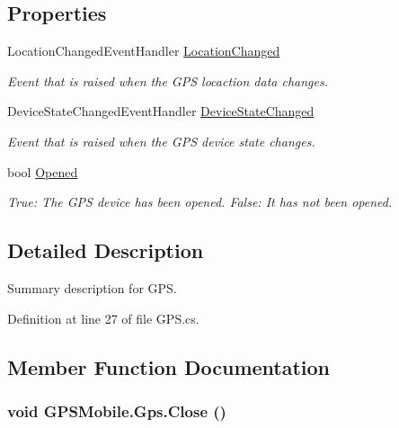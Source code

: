 \subsection*{Properties}
\begin{DoxyCompactItemize}
\item 
LocationChangedEventHandler \hyperlink{class_g_p_s_mobile_1_1_gps_a47e124eef5d1e94dc800878a046540ae}{LocationChanged}
\begin{DoxyCompactList}\small\item\em Event that is raised when the GPS locaction data changes. \item\end{DoxyCompactList}\item 
DeviceStateChangedEventHandler \hyperlink{class_g_p_s_mobile_1_1_gps_a23f86fff99fbb1192ccab1cc17c3354c}{DeviceStateChanged}
\begin{DoxyCompactList}\small\item\em Event that is raised when the GPS device state changes. \item\end{DoxyCompactList}\item 
bool \hyperlink{class_g_p_s_mobile_1_1_gps_a3d0d76091c29c1caaa322f8fa90945c0}{Opened}
\begin{DoxyCompactList}\small\item\em True: The GPS device has been opened. False: It has not been opened. \item\end{DoxyCompactList}\end{DoxyCompactItemize}


\subsection{Detailed Description}
Summary description for GPS. 

Definition at line 27 of file GPS.cs.

\subsection{Member Function Documentation}
\hypertarget{class_g_p_s_mobile_1_1_gps_a5de6d1f72d12b75a4407d200edba2259}{
\subsubsection[{Close}]{\setlength{\rightskip}{0pt plus 5cm}void GPSMobile.Gps.Close ()}}
\label{class_g_p_s_mobile_1_1_gps_a5de6d1f72d12b75a4407d200edba2259}


